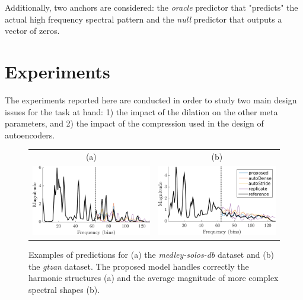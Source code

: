 \documentclass{article}
\begin{document}

Additionally, two anchors are considered: the \textit{oracle} predictor that "predicts" the actual high frequency spectral pattern and the \textit{null} predictor that outputs a vector of zeros.

\section{Experiments}
\label{sec:experiments}

The experiments reported here are conducted in order to study two main design issues for the task at hand: 1) the impact of the dilation on the other meta parameters, and 2) the impact of the compression used in the design of autoencoders.

\begin{figure}[t]
\center
\begin{tabular}{cc}
  (a) & (b) \\
  \includegraphics[width = .9\columnwidth]{figures/solos_1141.png}
&
  \includegraphics[width = .9\columnwidth]{figures/gtzan_1120.png}
\end{tabular}
\caption{Examples of predictions for (a) the \textit{medley-solos-db} dataset and (b) the \textit{gtzan} dataset. The proposed model handles correctly the harmonic structures (a) and the average magnitude of more complex spectral shapes (b).}
\label{fig:spec}
\vspace{-2mm}
\end{figure}
\end{document}
